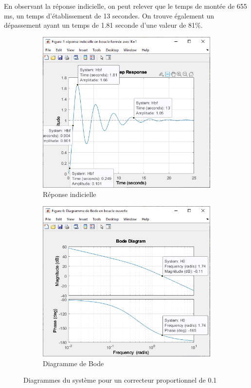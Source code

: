 \documentclass{article}
\begin{document}
En observant la réponse indicielle, on peut relever que le temps de montée de 655 ms, un temps d'établissement de 13 secondes. On trouve également un dépassement ayant un temps de 1.81 seconde d'une valeur de 81\%.
\begin{figure}
    \centering
    \begin{subfigure}[b]{0.4\textwidth}
        \centering
        \includegraphics[width=\textwidth]{step126.PNG}
        \caption{Réponse indicielle}
        \label{fig:step126}
    \end{subfigure}
    \hfill
    \begin{subfigure}[b]{0.4\textwidth}
        \centering
        \includegraphics[width=\textwidth]{bode126.PNG}
        \caption{Diagramme de Bode}
        \label{fig:bode126}
    \end{subfigure}
    \caption{Diagrammes du système pour un correcteur proportionnel de 0.1}
\end{figure}
\end{document}
